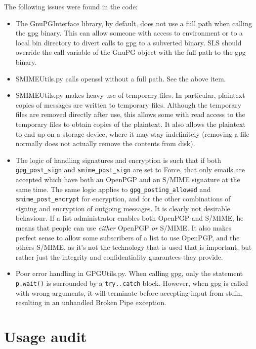 \documentclass[a4]{article}
\begin{document}
The following issues were found in the code:
\begin{itemize}
\item
The GnuPGInterface library, by default, does not use a full path when calling the gpg binary.
This can allow someone with access to environment or to a local bin directory to divert calls to gpg to a subverted binary.
SLS should override the call variable of the GnuPG object with the full path to the gpg binary.

\item
SMIMEUtils.py calls openssl without a full path.
See the above item.

\item
SMIMEUtils.py makes heavy use of temporary files.
In particular, plaintext copies of messages are written to temporary files.
Although the temporary files are removed directly after use,
this allows some with read access to the temporary files to obtain copies of the plaintext.
It also allows the plaintext to end up on a storage device,
where it may stay indefinitely
(removing a file normally does not actually remove the contents from disk).

\item
The logic of handling signatures and encryption is such
that if both \texttt{gpg\_post\_sign} and \texttt{smime\_post\_sign} are set to Force,
that only emails are accepted which have both an OpenPGP and an S/MIME signature at the same time.
The same logic applies to \texttt{gpg\_posting\_allowed} and \texttt{smime\_post\_encrypt} for encryption, and for the other combinations of signing and encryption of outgoing messages.
It is clearly not desirable behaviour.
If a list administrator enables both OpenPGP and S/MIME,
he means that people can use {\em either} OpenPGP {\em or} S/MIME.
It also makes perfect sense to allow some subscribers of a list to use OpenPGP, and the others S/MIME, as it's not the technology that is used that is important, but rather just the integrity and confidentiality guarantees they provide.

\item
Poor error handling in GPGUtils.py. When calling gpg, only the statement
\verb|p.wait()| is surrounded by a \verb|try..catch| block. However, when gpg is called
with wrong arguments, it will terminate before accepting input from stdin,
resulting in an unhandled Broken Pipe exception.
\end{itemize}

\section{Usage audit}
\end{document}
